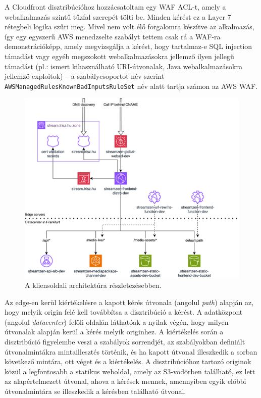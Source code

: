 A Cloudfront disztribúcióhoz hozzácsatoltam egy WAF ACL-t, amely a webalkalmazás szintű tűzfal szerepét tölti be. Minden kérést ez a Layer 7 rétegbeli logika szűri meg. Mivel nem volt élő forgalomra készítve az alkalmazás, így egy egyszerű AWS menedzselte szabályt tettem csak rá a WAF-ra demonstrációképp, amely megvizsgálja a kérést, hogy tartalmaz-e SQL injection támadást vagy egyéb megszokott webalkalmazásokra jellemző ilyen jellegű támadást (pl.: ismert kihasználható URI-útvonalak, Java webalkalmazásokra jellemző exploitok) -- a szabálycsoportot név szerint \verb|AWSManagedRulesKnownBadInputsRuleSet| név alatt tartja számon az AWS WAF.

\begin{figure}[ht]
  \centering
  \includegraphics[width=150mm, keepaspectratio]{figures/dipterv_client.png}
  \caption{A kliensoldali architektúra részletezésebben.}
  \label{fig:client}
\end{figure}

Az edge-en kerül kiértékelésre a kapott kérés útvonala (angolul \emph{path}) alapján az, hogy melyik origin felé kell továbbítsa a disztribúció a kérést. A  adatközpont (angolul \emph{datacenter}) felőli oldalán láthatóak a nyilak végén, hogy milyen útvonalak alapján kerül a kérés melyik originhez. A kiértékelés során a disztribúció figyelembe veszi a szabályok sorrendjét, az szabályokban definiált útvonalmintákra mintaillesztés történik, és ha kapott útvonal illeszkedik a sorban következő mintára, ott véget és a kiértékelés. A disztribúcióhoz tartozó originok közül a legfontosabb a statikus weboldal, amely az S3-vödörben található, ez lett az alapértelmezett útvonal, ahova a kérések mennek, amennyiben egyik előbbi útvonalmintára se illeszkedik a kérésben található útvonal.

